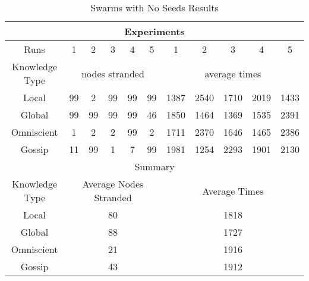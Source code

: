 \begin{table*}
\centering
\caption{Swarms with No Seeds Results}
\begin{tabular}{|c|c|c|c|c|c|c|c|c|c|c|} \hline
\multicolumn{11}{|c|}{Experiments}\\ \hline
Runs & 1 & 2 & 3 & 4 & 5 & 1 & 2 & 3 & 4 & 5\\ \hline
Knowledge Type & \multicolumn{5}{c|}{nodes stranded} & \multicolumn{5}{c|}{average times}\\ \hline
Local      & 99&  2& 99& 99& 99&1387&2540&1710&2019&1433\\
Global     & 99& 99& 99& 99& 46&1850&1464&1369&1535&2391\\
Omniscient &  1&  2&  2& 99&  2&1711&2370&1646&1465&2386\\ 
Gossip      & 11& 99&  1&  7& 99&1981&1254&2293&1901&2130\\ \hline \hline
\multicolumn{11}{|c|}{Summary}\\ \hline
Knowledge Type & \multicolumn{5}{c|}{Average Nodes Stranded} & \multicolumn{5}{c|}{Average Times}\\ \hline
Local & \multicolumn{5}{c|}{80} & \multicolumn{5}{c|}{1818}\\
Global & \multicolumn{5}{c|}{88} & \multicolumn{5}{c|}{1727}\\
Omniscient & \multicolumn{5}{c|}{21} & \multicolumn{5}{c|}{1916}\\
Gossip      & \multicolumn{5}{c|}{43} & \multicolumn{5}{c|}{1912}\\
\hline\end{tabular}
\label{tab:noseedresults}
\end{table*}




